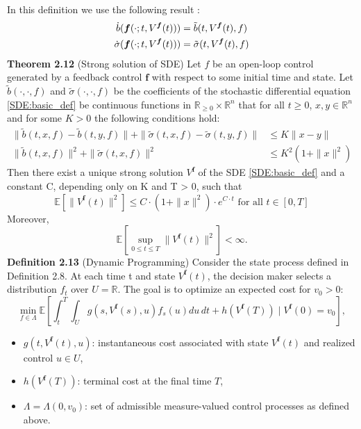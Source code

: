 \documentclass[oneside, a4paper, onecolumn, 11pt]{article}
\begin{document}
In this definition we use the following result :
\begin{align*}
\dot{b}(\boldsymbol{f}(\cdot;t, V^{\boldsymbol{f}}(t))) &= \Tilde{b}(t, V^{\boldsymbol{f}}(t), f) \\
\dot{\sigma}(\boldsymbol{f}(\cdot;t, V^{\boldsymbol{f}}(t))) &= \Tilde{\sigma}(t, V^{\boldsymbol{f}}(t), f)
\end{align*}
\textbf{Theorem 2.12} (Strong solution of SDE) \cite{Zagst2002}
Let $f$ be an open-loop control generated by a feedback control $\boldsymbol{f}$ with respect to some initial  time and state.
Let $\tilde{b}(\cdot, \cdot, f)$ and $\tilde{\sigma}(\cdot, \cdot, f)$ be the coefficients of the stochastic differential equation \eqref{SDE:basic_def} be continuous functions in $\mathbb{R}_{\geq 0}\times\mathbb{R}^n$ that for all $t\geq 0$, $x,y \in \mathbb{R}^n$ and for some $K>0$ the following conditions hold: 
\begin{align}
\|\tilde{b}(t,x,f) - \tilde{b}(t,y,f)\|  + \|\tilde{\sigma}(t,x,f) - \tilde{\sigma}(t,y,f)\|  &\leq K \|x-y\|\\
\|\tilde{b}(t,x,f)\| ^2 +  \|\tilde{\sigma}(t,x,f)\|^2 &\leq K^2(1+\|x\|^2)
\end{align}
Then there exist a unique strong solution $V^{\boldsymbol{f}}$  of the SDE \eqref{SDE:basic_def} and a constant C, depending only on K and T > 0, such that
\begin{equation}
\mathbb{E}\left[\| V^{\boldsymbol{f}}(t)\|^2\right] \leq C \cdot (1+ \|x\|^2) \cdot e^{C\cdot t} \text { for all } t\in [0,T]      
\end{equation}
Moreover, 
\begin{equation}
\mathbb{E}\left[\sup_{0\leq t\leq T} \|V^{\boldsymbol{f}}(t)\|^2\right] < \infty.
\end{equation}
\textbf{Definition 2.13} (Dynamic Programming) Consider the state process defined in Definition 2.8.
At each time t and state \( V^{\boldsymbol{f}}(t) \), the decision maker selects a distribution \( f_t\) over \( U = \mathbb{R} \).  
The goal is to optimize an expected cost for $v_0 > 0$:
\begin{equation}
\min_{f \in \Lambda} \mathbb{E}\left[ \int_{t}^{T} \int_{U} g(s, V^{\boldsymbol{f}}(s), u) f_s(u) du \, dt + h(V^{\boldsymbol{f}}(T)) \mid V^{\boldsymbol{f}}(0) =  v_0 \right], \label{eq:dynamic_programming_def}    
\end{equation}
\begin{itemize}
    \item \( g(t, V^{\boldsymbol{f}}(t), u) \): instantaneous cost associated with state \( V^{\boldsymbol{f}}(t) \) and realized control \( u \in U \),
    \item \( h(V^{\boldsymbol{f}}(T)) \): terminal cost at the final time \( T \),
    \item \( \Lambda = \Lambda(0,v_0) \): set of admissible measure-valued control processes as defined above.
\end{itemize}
\end{document}
